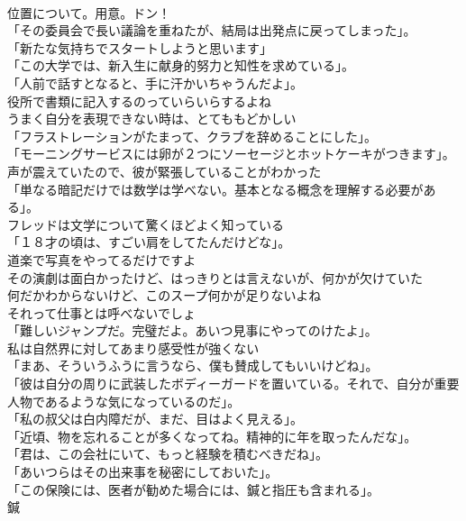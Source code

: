 \documentclass[8pt]{extreport}
\begin{document}
\begin{CJK}{UTF8}{min}
\\	位置について。用意。ドン！	
\\	「その委員会で長い議論を重ねたが、結局は出発点に戻ってしまった」。	
\\	「新たな気持ちでスタートしようと思います」	
\\	「この大学では、新入生に献身的努力と知性を求めている」。	
\\	「人前で話すとなると、手に汗かいちゃうんだよ」。	
\\	役所で書類に記入するのっていらいらするよね	
\\	うまく自分を表現できない時は、とてももどかしい	
\\	「フラストレーションがたまって、クラブを辞めることにした」。	
\\	「モーニングサービスには卵が２つにソーセージとホットケーキがつきます」。	
\\	声が震えていたので、彼が緊張していることがわかった	
\\	「単なる暗記だけでは数学は学べない。基本となる概念を理解する必要がある」。	
\\	フレッドは文学について驚くほどよく知っている	
\\	「１８才の頃は、すごい肩をしてたんだけどな」。	
\\	道楽で写真をやってるだけですよ	
\\	その演劇は面白かったけど、はっきりとは言えないが、何かが欠けていた	
\\	何だかわからないけど、このスープ何かが足りないよね	
\\	それって仕事とは呼べないでしょ	
\\	「難しいジャンプだ。完璧だよ。あいつ見事にやってのけたよ」。	
\\	私は自然界に対してあまり感受性が強くない	
\\	「まあ、そういうふうに言うなら、僕も賛成してもいいけどね」。	
\\	「彼は自分の周りに武装したボディーガードを置いている。それで、自分が重要人物であるような気になっているのだ」。	
\\	「私の叔父は白内障だが、まだ、目はよく見える」。	
\\	「近頃、物を忘れることが多くなってね。精神的に年を取ったんだな」。	
\\	「君は、この会社にいて、もっと経験を積むべきだね」。	
\\	「あいつらはその出来事を秘密にしておいた」。	
\\	「この保険には、医者が勧めた場合には、鍼と指圧も含まれる」。	
\\	鍼

\end{CJK}
\end{document}
